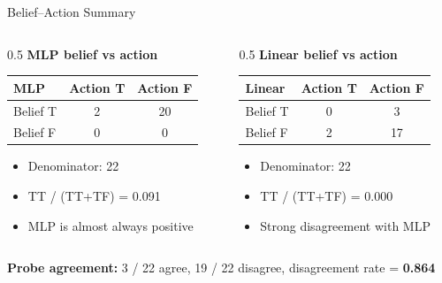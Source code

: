 \documentclass[aspectratio=169]{beamer}
\begin{document}
\begin{frame}{Belief--Action Summary}
\begin{columns}[T]
\begin{column}{0.5\textwidth}
\textbf{MLP belief vs action} \\
\vspace{0.3em}
\begin{tabular}{lcc}
\toprule
\textbf{MLP} & \textbf{Action T} & \textbf{Action F} \\
\midrule
Belief T & 2 & 20 \\
Belief F & 0 & 0 \\
\bottomrule
\end{tabular}

\vspace{0.5em}
\begin{itemize}
  \item Denominator: 22
  \item TT / (TT+TF) = 0.091
  \item MLP is almost always positive
\end{itemize}
\end{column}

\begin{column}{0.5\textwidth}
\textbf{Linear belief vs action} \\
\vspace{0.3em}
\begin{tabular}{lcc}
\toprule
\textbf{Linear} & \textbf{Action T} & \textbf{Action F} \\
\midrule
Belief T & 0 & 3 \\
Belief F & 2 & 17 \\
\bottomrule
\end{tabular}

\vspace{0.5em}
\begin{itemize}
  \item Denominator: 22
  \item TT / (TT+TF) = 0.000
  \item Strong disagreement with MLP
\end{itemize}
\end{column}
\end{columns}

\vspace{0.6em}
\textbf{Probe agreement:} 3 / 22 agree, 19 / 22 disagree, disagreement rate = \textbf{0.864}
\end{frame}
\end{document}
